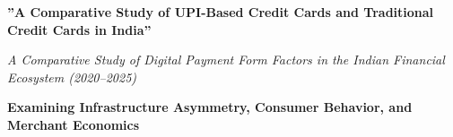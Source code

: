 
\begin{center}
\vspace{1cm}

{\LARGE \textbf{''A Comparative Study of UPI-Based Credit
Cards and Traditional Credit Cards in India''}}

\vspace{2cm}

\textit{A Comparative Study of Digital Payment Form Factors in the Indian Financial Ecosystem (2020--2025)}
\end{center}

\vspace{2cm}

\textbf{Examining Infrastructure Asymmetry, Consumer Behavior, and Merchant Economics}

